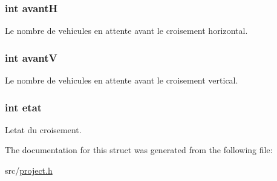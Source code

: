 \subsubsection[{avant\+H}]{\setlength{\rightskip}{0pt plus 5cm}int avant\+H}\label{struct_croisement_aec0a573c81b0f7b93447e88cb693c578}
Le nombre de vehicules en attente avant le croisement horizontal. \hypertarget{struct_croisement_ab78c7081771d7a1ee85e5adb38c62d3d}{}
\subsubsection[{avant\+V}]{\setlength{\rightskip}{0pt plus 5cm}int avant\+V}\label{struct_croisement_ab78c7081771d7a1ee85e5adb38c62d3d}
Le nombre de vehicules en attente avant le croisement vertical. \hypertarget{struct_croisement_a593430af208bfef9b3ce7325558b667b}{}
\subsubsection[{etat}]{\setlength{\rightskip}{0pt plus 5cm}int etat}\label{struct_croisement_a593430af208bfef9b3ce7325558b667b}
L\textquotesingle{}etat du croisement. 

The documentation for this struct was generated from the following file\+:\begin{DoxyCompactItemize}
\item 
src/\hyperlink{project_8h}{project.\+h}\end{DoxyCompactItemize}
